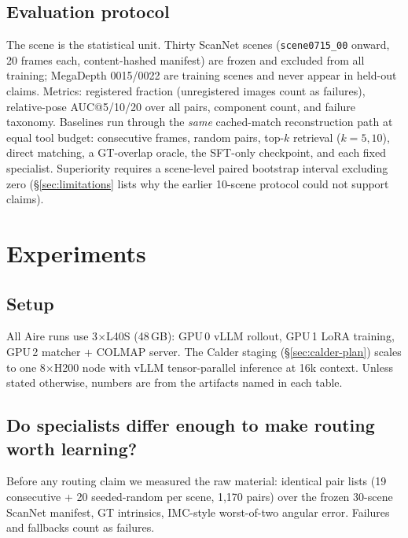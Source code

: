 \documentclass[10pt,twocolumn,letterpaper]{article}
\begin{document}
\subsection{Evaluation protocol}
\label{sec:protocol}

The scene is the statistical unit. Thirty ScanNet scenes
(\texttt{scene0715\_00} onward, 20 frames each, content-hashed manifest)
are frozen and excluded from all training; MegaDepth 0015/0022 are
training scenes and never appear in held-out claims. Metrics: registered
fraction (unregistered images count as failures), relative-pose
AUC@5/10/20 over all pairs, component count, and failure taxonomy.
Baselines run through the \emph{same} cached-match reconstruction path at
equal tool budget: consecutive frames, random pairs, top-$k$ retrieval
($k{=}5,10$), direct matching, a GT-overlap oracle, the SFT-only
checkpoint, and each fixed specialist. Superiority requires a scene-level
paired bootstrap interval excluding zero (\S\ref{sec:limitations} lists
why the earlier 10-scene protocol could not support claims).

\section{Experiments}
\label{sec:exp}

\subsection{Setup}

All Aire runs use 3$\times$L40S (48\,GB): GPU\,0 vLLM rollout, GPU\,1
LoRA training, GPU\,2 matcher + COLMAP server. The Calder staging
(\S\ref{sec:calder-plan}) scales to one 8$\times$H200 node with vLLM
tensor-parallel inference at 16k context. Unless stated otherwise, numbers
are from the artifacts named in each table.

\subsection{Do specialists differ enough to make routing worth learning?}
\label{sec:specialist-bench}

Before any routing claim we measured the raw material: identical pair
lists (19 consecutive + 20 seeded-random per scene, 1,170 pairs) over the
frozen 30-scene ScanNet manifest, GT intrinsics, IMC-style worst-of-two
angular error. Failures and fallbacks count as failures.
\end{document}
